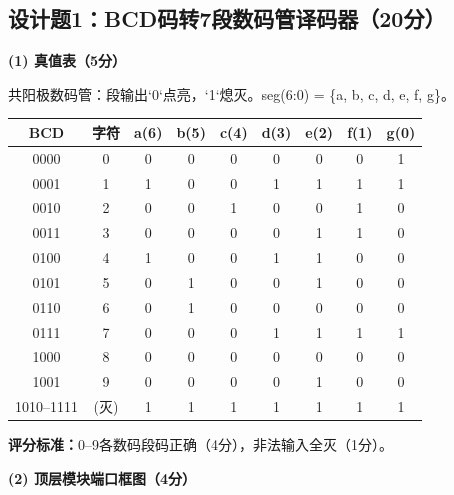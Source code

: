 \subsection{设计题1：BCD码转7段数码管译码器（20分）}

\textbf{(1) 真值表（5分）}

共阳极数码管：段输出`0`点亮，`1`熄灭。seg(6:0) = \{a, b, c, d, e, f, g\}。

\begin{center}
\begin{tabular}{|c|c|c|c|c|c|c|c|c|}
\hline
\textbf{BCD} & \textbf{字符} & \textbf{a(6)} & \textbf{b(5)} & \textbf{c(4)} & \textbf{d(3)} & \textbf{e(2)} & \textbf{f(1)} & \textbf{g(0)} \\
\hline
0000 & 0 & 0 & 0 & 0 & 0 & 0 & 0 & 1 \\
0001 & 1 & 1 & 0 & 0 & 1 & 1 & 1 & 1 \\
0010 & 2 & 0 & 0 & 1 & 0 & 0 & 1 & 0 \\
0011 & 3 & 0 & 0 & 0 & 0 & 1 & 1 & 0 \\
0100 & 4 & 1 & 0 & 0 & 1 & 1 & 0 & 0 \\
0101 & 5 & 0 & 1 & 0 & 0 & 1 & 0 & 0 \\
0110 & 6 & 0 & 1 & 0 & 0 & 0 & 0 & 0 \\
0111 & 7 & 0 & 0 & 0 & 1 & 1 & 1 & 1 \\
1000 & 8 & 0 & 0 & 0 & 0 & 0 & 0 & 0 \\
1001 & 9 & 0 & 0 & 0 & 0 & 1 & 0 & 0 \\
\hline
1010--1111 & (灭) & 1 & 1 & 1 & 1 & 1 & 1 & 1 \\
\hline
\end{tabular}
\end{center}

\textbf{评分标准：}0--9各数码段码正确（4分），非法输入全灭（1分）。

\vspace{0.3cm}

\textbf{(2) 顶层模块端口框图（4分）}

